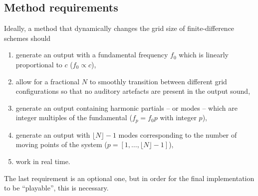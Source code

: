 \subsection{Method requirements}\label{sec:methodReq}
Ideally, a method that dynamically changes the grid size of finite-difference schemes should
\begin{enumerate}
    \item generate an output with a fundamental frequency $f_0$ %
    which is linearly proportional to $c$ ($f_0 \propto c$),
    \item allow for a fractional $N$ to smoothly transition 
    between different grid configurations so that no auditory artefacts are present in the output sound,
    \item generate an output containing harmonic partials -- or modes -- which are integer multiples of the fundamental ($f_p = f_0 p$ with integer $p$),
    \item generate an output with $\lfloor N\rfloor-1$ modes corresponding to the number of moving points of the system ($p = [1, \hdots, \allowbreak\lfloor N\rfloor-1]$),
    \item work in real time.
\end{enumerate}
The last requirement is an optional one, but in order for the final implementation to be ``playable'', this is necessary. 
%


